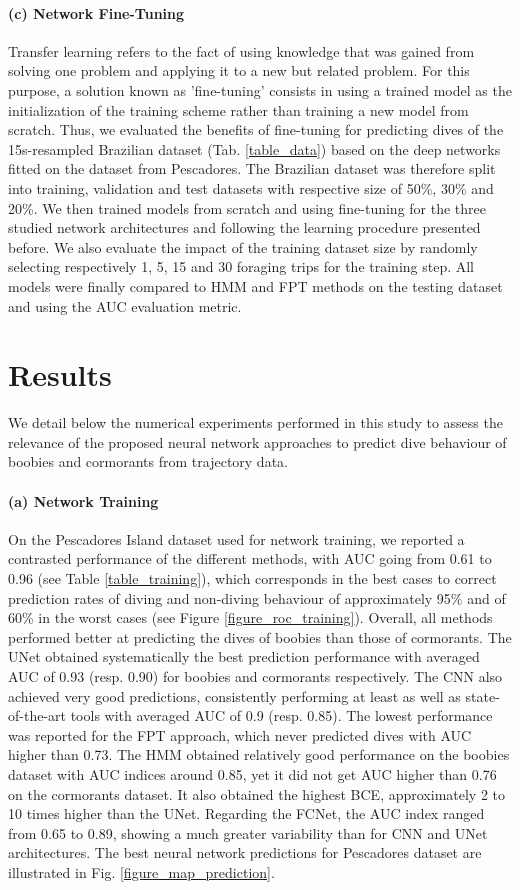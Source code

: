 \documentclass{article}
\begin{document}
\paragraph{(c) Network Fine-Tuning}
Transfer learning refers to the fact of using knowledge that was gained from solving one problem and applying it to a new but related problem. For this purpose, a solution known as 'fine-tuning' consists in using a trained model as the initialization of the training scheme rather than training a new model from scratch. Thus, we evaluated the benefits of fine-tuning for predicting dives of the 15s-resampled Brazilian dataset (Tab. \ref{table_data}) based on the deep networks fitted on the dataset from Pescadores. The Brazilian dataset was therefore split into training, validation and test datasets with respective size of 50\%, 30\% and 20\%. We then trained models from scratch and using fine-tuning for the three studied network architectures and following the learning procedure presented before. We also evaluate the impact of the training dataset size by randomly selecting respectively 1, 5, 15 and 30 foraging trips for the training step. All models were finally compared to HMM and FPT methods on the testing dataset and using the AUC evaluation metric.

\section{Results}

We detail below the numerical experiments performed in this study to assess the relevance of the proposed neural network approaches to predict dive behaviour of boobies and cormorants from trajectory data.

\paragraph{(a) Network Training}
On the Pescadores Island dataset used for network training, we reported a contrasted performance of the different methods, with AUC going from 0.61 to 0.96 (see Table \ref{table_training}), which corresponds in the best cases to correct prediction rates of diving and non-diving behaviour of approximately 95\% and of 60\% in the worst cases (see Figure \ref{figure_roc_training}). Overall, all methods performed better at predicting the dives of boobies than those of cormorants. The UNet obtained systematically the best prediction performance with averaged AUC of 0.93 (resp. 0.90) for boobies and cormorants respectively. The CNN also achieved very good predictions, consistently performing at least as well as state-of-the-art tools with averaged AUC of 0.9 (resp. 0.85). The lowest performance was reported for the FPT approach, which never predicted dives with AUC higher than 0.73. The HMM obtained relatively good performance on the boobies dataset with AUC indices around 0.85, yet it did not get AUC higher than 0.76 on the cormorants dataset. It also obtained the highest BCE, approximately 2 to 10 times higher than the UNet. Regarding the FCNet, the AUC index ranged from
0.65 to 0.89, showing a much greater variability than for CNN and UNet architectures. The best neural network predictions for Pescadores dataset are illustrated in Fig. \ref{figure_map_prediction}.
\end{document}
